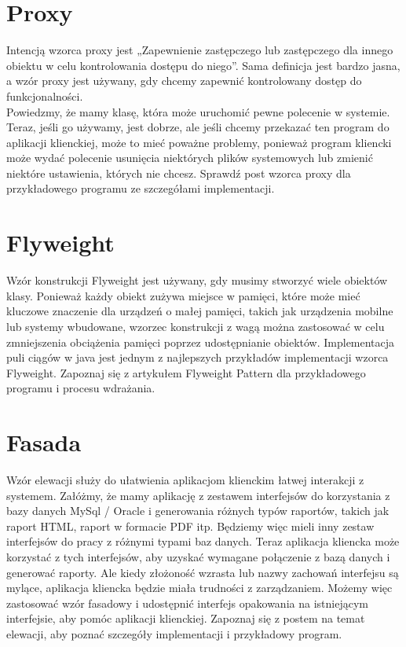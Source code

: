 \documentclass[12pt,a4paper]{article}
\begin{document}
	\section{Proxy}
	Intencją wzorca proxy jest „Zapewnienie zastępczego lub zastępczego dla innego obiektu w celu kontrolowania dostępu do niego”. Sama definicja jest bardzo jasna, a wzór proxy jest używany, gdy chcemy zapewnić kontrolowany dostęp do funkcjonalności.\\
	Powiedzmy, że mamy klasę, która może uruchomić pewne polecenie w systemie. Teraz, jeśli go używamy, jest dobrze, ale jeśli chcemy przekazać ten program do aplikacji klienckiej, może to mieć poważne problemy, ponieważ program kliencki może wydać polecenie usunięcia niektórych plików systemowych lub zmienić niektóre ustawienia, których nie chcesz. Sprawdź post wzorca proxy dla przykładowego programu ze szczegółami implementacji\cite{PankajKumar}.
	\section{Flyweight}
	Wzór konstrukcji Flyweight jest używany, gdy musimy stworzyć wiele obiektów klasy. Ponieważ każdy obiekt zużywa miejsce w pamięci, które może mieć kluczowe znaczenie dla urządzeń o małej pamięci, takich jak urządzenia mobilne lub systemy wbudowane, wzorzec konstrukcji z wagą można zastosować w celu zmniejszenia obciążenia pamięci poprzez udostępnianie obiektów. Implementacja puli ciągów w java jest jednym z najlepszych przykładów implementacji wzorca Flyweight. Zapoznaj się z artykułem Flyweight Pattern dla przykładowego programu i procesu wdrażania\cite{PankajKumar}.
	\section{Fasada}
	Wzór elewacji służy do ułatwienia aplikacjom klienckim łatwej interakcji z systemem. Załóżmy, że mamy aplikację z zestawem interfejsów do korzystania z bazy danych MySql / Oracle i generowania różnych typów raportów, takich jak raport HTML, raport w formacie PDF itp. Będziemy więc mieli inny zestaw interfejsów do pracy z różnymi typami baz danych. Teraz aplikacja kliencka może korzystać z tych interfejsów, aby uzyskać wymagane połączenie z bazą danych i generować raporty. Ale kiedy złożoność wzrasta lub nazwy zachowań interfejsu są mylące, aplikacja kliencka będzie miała trudności z zarządzaniem. Możemy więc zastosować wzór fasadowy i udostępnić interfejs opakowania na istniejącym interfejsie, aby pomóc aplikacji klienckiej. Zapoznaj się z postem na temat elewacji, aby poznać szczegóły implementacji i przykładowy program\cite{PankajKumar}.
\end{document}
